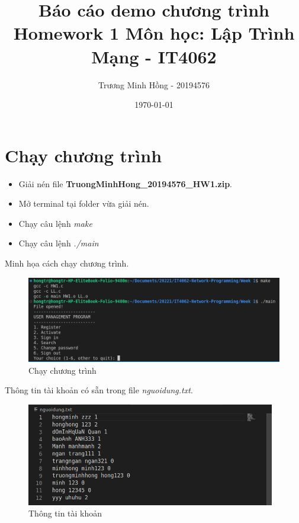 \documentclass[12pt]{article}
\title{\textbf{Báo cáo demo chương trình Homework 1 \linebreak Môn học: Lập Trình Mạng - IT4062}}
\author{Trương Minh Hồng - 20194576}
\date{\today}
\begin{document}
\maketitle

\section{Chạy chương trình}

\begin{itemize}

\item Giải nén file \textbf{TruongMinhHong{\_}20194576{\_}HW1.zip}.
\item Mở terminal tại folder vừa giải nén.
\item Chạy câu lệnh \textit{make}
\item Chạy câu lệnh \textit{./main}
\end{itemize}
Minh họa cách chạy chương trình.

\begin{figure}[h]
    \begin{center}
        \includegraphics[width=0.8\linewidth]{Img/demo.png}
    \end{center}
    \caption{Chạy chương trình}
    \label{fig:demo}
  \end{figure}

Thông tin tài khoản có sẵn trong file \textit{nguoidung.txt}.

\begin{figure}[h]
    \begin{center}
        \includegraphics[width=0.8\linewidth, height=4.5cm]{Img/file.png}
    \end{center}
    \caption{Thông tin tài khoản}
    \label{fig:file}
\end{figure}
\end{document}
